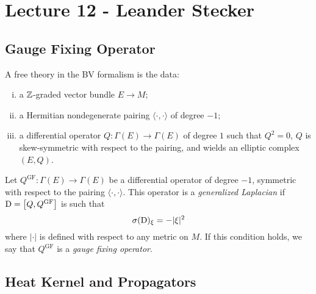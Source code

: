 \chapter{Lecture 12 - Leander Stecker}

\section{Gauge Fixing Operator}

\begin{definition}
  A free theory in the BV formalism is the data:
  \begin{enumerate}[i)]
    \item a $\mathbb{Z}$-graded vector bundle $E \to M$;
    \item a Hermitian nondegenerate pairing $\langle \cdot, \cdot \rangle$ of degree $-1$;
    \item a differential operator $Q \colon \Gamma(E) \to \Gamma(E)$ of degree $1$ such that $Q^2 = 0$, $Q$ is skew-symmetric with respect to the pairing, and wields an elliptic complex $(E, Q)$.
  \end{enumerate}
\end{definition}

\begin{definition}
  Let
  $Q^\text{GF} \colon \Gamma(E) \to \Gamma(E)$
  be a differential operator of degree $-1$, symmetric with respect to the pairing $\langle \cdot, \cdot \rangle$.
  This operator is a \textit{generalized Laplacian} if $\mathrm{D} = \big[Q, Q^\text{GF}\big]$ is such that
  \begin{equation*}
    \sigma(\mathrm{D})_\xi = - |\xi|^2
  \end{equation*}
  where $|\cdot|$ is defined with respect to any metric on $M$.
  If this condition holds, we say that $Q^\text{GF}$ is a \textit{gauge fixing operator}.
\end{definition}

\section{Heat Kernel and Propagators}

